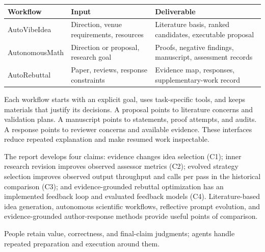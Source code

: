 \begin{center}\small
\begin{tabularx}{\textwidth}{P{34mm}Y Y}
\toprule
\textbf{Workflow} & \textbf{Input} & \textbf{Deliverable}\\
\midrule
AutoVibeIdea & Direction, venue requirements, resources & Literature basis, ranked candidates, executable proposal\\
AutonomousMath & Direction or proposal, research goal & Proofs, negative findings, manuscript, assessment records\\
AutoRebuttal & Paper, reviews, response constraints & Evidence map, responses, supplementary-work record\\
\bottomrule
\end{tabularx}
\end{center}
Each workflow starts with an explicit goal, uses task-specific tools, and keeps materials that justify its decisions. A proposal points to literature concerns and validation plans. A manuscript points to statements, proof attempts, and audits. A response points to reviewer concerns and available evidence. These interfaces reduce repeated explanation and make resumed work inspectable.

The report develops four claims: evidence changes idea selection (C1); inner research revision improves observed assessor metrics (C2); evolved strategy selection improves observed output throughput and calls per pass in the historical comparison (C3); and evidence-grounded rebuttal optimization has an implemented feedback loop and evaluated feedback models (C4). Literature-based idea generation, autonomous scientific workflows, reflective prompt evolution, and evidence-grounded author-response methods provide useful points of comparison.

People retain value, correctness, and final-claim judgments; agents handle repeated preparation and execution around them.

